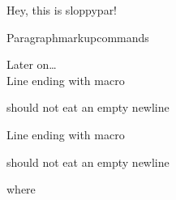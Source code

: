 \documentclass[draft]{book}
\begin{document}
\begin{sloppypar}
Hey, this is sloppypar!
\end{sloppypar}

Paragraph\linebreak[3]markup\linebreak{}commands

Later on\ldots\\

Line ending with macro\macro

should not eat an empty newline

Line ending with macro\macro{}

should not eat an empty newline



where\addtocounter{equation}{1}\setcounter{equation}{50}

\cleardoublepage
{}
{}
\printindex
\end{document}
